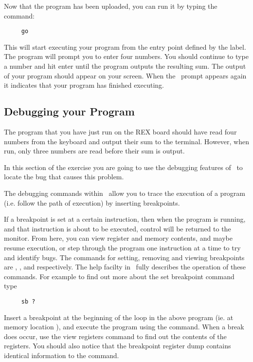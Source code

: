 Now that the program has been uploaded, you can run it by typing the command:
\begin{verbatim}
     go
\end{verbatim}

This will start executing your program from the entry point defined by the 
 label. The program will
prompt you to enter four numbers. You should continue to type a number and 
hit enter until the program
outputs the resulting sum. The output of your program should appear on your 
screen. When the \WRAMPmon\
prompt appears again it indicates that your program has finished executing.


\subsection{Debugging your Program}
The program that you have just run on the REX board should have read four 
numbers from the keyboard and
output their sum to the terminal. However, when run, only three numbers
are read before their sum is output.

In this section of the exercise you are going to use the debugging 
features of \WRAMPmon\ to locate the bug that
causes this problem.

The debugging commands within \WRAMPmon\ allow you to trace the execution 
of a program (i.e. follow the path
of execution) by inserting breakpoints.

If a breakpoint is set at a certain instruction, then when the program
is running, and that instruction is about to be executed, control will
be returned to the monitor. From here, you can view register and
memory contents, and maybe resume execution, or step through the
program one instruction at a time to try and identify bugs.  The
commands for setting, removing and viewing breakpoints are ,
\src{rb}, and \src{vb} respectively. The help facilty in \WRAMPmon\
fully describes the operation of these commands. For example to find
out more about the set breakpoint command type
\begin{verbatim}
     sb ?
\end{verbatim}

Insert a breakpoint at the beginning of the loop in the above program 
(ie. at memory location ), and
execute the program using the \src{go} command.
When a break does occur, use the view registers command to find out the 
contents of the registers. You should also notice that the breakpoint 
register dump contains identical information
to the \src{vr} command.

